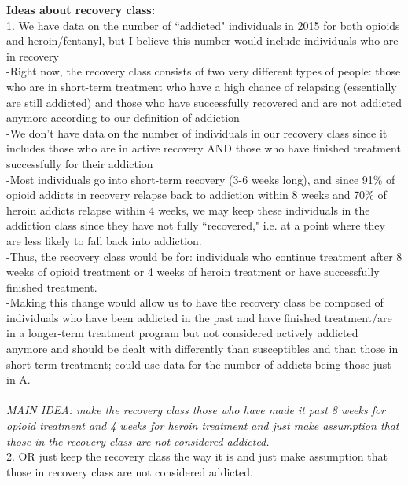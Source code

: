 \documentclass[12pt]{article}
\begin{document}
\noindent \textbf{Ideas about recovery class:} \\ 

1.  \noindent We have data on the number of ``addicted" individuals in 2015 for both opioids and heroin/fentanyl, but I believe this number would include individuals who are in recovery \\
-Right now, the recovery class consists of two very different types of people: those who are in short-term treatment who have a high chance of relapsing (essentially are still addicted) and those who have successfully recovered and are not addicted anymore according to our definition of addiction \\
-We don't have data on the number of individuals in our recovery class since it includes those who are in active recovery AND those who have finished treatment successfully for their addiction \\
-Most individuals go into short-term recovery (3-6 weeks long), and since 91\% of opioid addicts in recovery relapse back to addiction within 8 weeks and 70\% of heroin addicts relapse within 4 weeks, we may keep these individuals in the addiction class since they have not fully ``recovered," i.e. at a point where they are less likely to fall back into addiction. \cite{SAMSHA4, NIH4} \\
-Thus, the recovery class would be for: individuals who continue treatment after 8 weeks of opioid treatment or 4 weeks of heroin treatment or have successfully finished treatment. \\
-Making this change would allow us to have the recovery class be composed of individuals who have been addicted in the past and have finished treatment/are in a longer-term treatment program but not considered actively addicted anymore and should be dealt with differently than susceptibles and than those in short-term treatment; could use data for the number of addicts being those just in A. \\ \\
\textit{MAIN IDEA: make the recovery class those who have made it past 8 weeks for opioid treatment and 4 weeks for heroin treatment and just make assumption that those in the recovery class are not considered addicted.}\\

2. \noindent OR just keep the recovery class the way it is and just make assumption that those in recovery class are not considered addicted. \\
\end{document}
